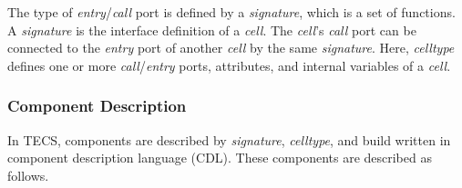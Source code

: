 \documentclass[JIP]{ipsj_v2/UTF8/ipsj}
\begin{document}
The type of {\it entry}/{\it call} port is defined by a {\it signature}, which is a set of functions.
A {\it signature} is the interface definition of a {\it cell}.
The {\it cell}'s  {\it call} port can be connected to the {\it entry} port of another {\it cell} by the same {\it signature}.
Here, {\it celltype} defines one or more {\it call}/{\it entry} ports, attributes, and internal variables of a {\it cell}.


\subsubsection{Component Description}
In TECS, components are described by {\it signature}, {\it celltype}, and build written in component description language (CDL).
These components are described as follows.
\end{document}
